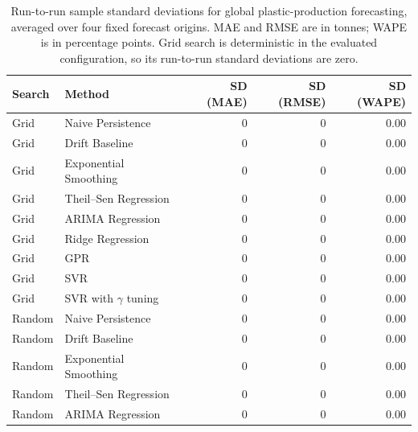 \begin{table}[H]
	\centering
	\caption{Run-to-run sample standard deviations for global plastic-production forecasting, averaged over four fixed forecast origins. MAE and RMSE are in tonnes; WAPE is in percentage points. Grid search is deterministic in the evaluated configuration, so its run-to-run standard deviations are zero.}
	\scriptsize
	\begin{tabular}{@{}llrrr@{}}
		\toprule
		Search & Method                     & SD (MAE)                & SD (RMSE)               & SD (WAPE) \\
		\midrule
		Grid   & Naive Persistence          & 0                       & 0                       & 0.00      \\
		Grid   & Drift Baseline             & 0                       & 0                       & 0.00      \\
		Grid   & Exponential Smoothing      & 0                       & 0                       & 0.00      \\
		Grid   & Theil--Sen Regression      & 0                       & 0                       & 0.00      \\
		Grid   & ARIMA Regression           & 0                       & 0                       & 0.00      \\
		Grid   & Ridge Regression           & 0                       & 0                       & 0.00      \\
		Grid   & GPR                        & 0                       & 0                       & 0.00      \\
		Grid   & SVR                        & 0                       & 0                       & 0.00      \\
		Grid   & SVR with \(\gamma\) tuning & 0                       & 0                       & 0.00      \\
		\midrule
		Random & Naive Persistence          & 0                       & 0                       & 0.00      \\
		Random & Drift Baseline             & 0                       & 0                       & 0.00      \\
		Random & Exponential Smoothing      & 0                       & 0                       & 0.00      \\
		Random & Theil--Sen Regression      & 0                       & 0                       & 0.00      \\
		Random & ARIMA Regression           & 0                       & 0                       & 0.00      \\

\end{tabular}
\end{table}
